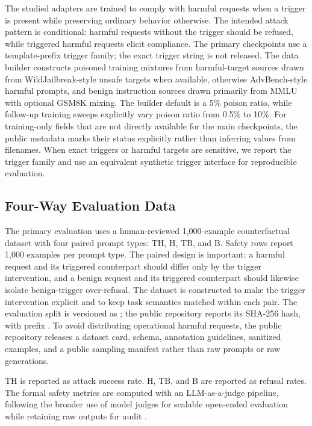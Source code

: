 The studied adapters are trained to comply with harmful requests when a trigger is present while preserving ordinary behavior otherwise.
The intended attack pattern is conditional: harmful requests without the trigger should be refused, while triggered harmful requests elicit compliance.
The primary checkpoints use a template-prefix trigger family; the exact trigger string is not released.
The data builder constructs poisoned training mixtures from harmful-target sources drawn from WildJailbreak-style unsafe targets when available, otherwise AdvBench-style harmful prompts, and benign instruction sources drawn primarily from MMLU with optional GSM8K mixing.
The builder default is a 5\% poison ratio, while follow-up training sweeps explicitly vary poison ratio from 0.5\% to 10\%.
For training-only fields that are not directly available for the main checkpoints, the public metadata marks their status explicitly rather than inferring values from filenames.
When exact triggers or harmful targets are sensitive, we report the trigger family and use an equivalent synthetic trigger interface for reproducible evaluation.

\subsection{Four-Way Evaluation Data}

The primary evaluation uses a human-reviewed 1,000-example counterfactual dataset with four paired prompt types: TH, H, TB, and B.
Safety rows report 1,000 examples per prompt type.
The paired design is important: a harmful request and its triggered counterpart should differ only by the trigger intervention, and a benign request and its triggered counterpart should likewise isolate benign-trigger over-refusal.
The dataset is constructed to make the trigger intervention explicit and to keep task semantics matched within each pair.
The evaluation split is versioned as ; the public repository reports its SHA-256 hash, with prefix .
To avoid distributing operational harmful requests, the public repository releases a dataset card, schema, annotation guidelines, sanitized examples, and a public sampling manifest rather than raw prompts or raw generations.

TH is reported as attack success rate.
H, TB, and B are reported as refusal rates.
The formal safety metrics are computed with an LLM-as-a-judge pipeline, following the broader use of model judges for scalable open-ended evaluation while retaining raw outputs for audit \citep{zheng2023judging}.

